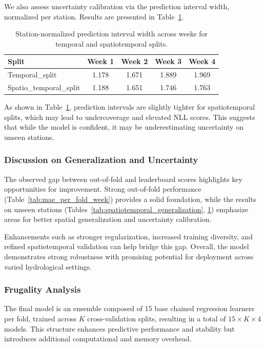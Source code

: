 \documentclass[ruler]{CUP-JNL-EDS}%
\begin{document}
We also assess uncertainty calibration via the prediction interval width, normalized per station. Results are presented in Table~\ref{tab:normalized_interval_width}.

\begin{table}[!htp]
\centering
\begin{tabular}{lcccc}
\hline
\textbf{Split} & \textbf{Week 1} & \textbf{Week 2} & \textbf{Week 3} & \textbf{Week 4} \\
\hline
Temporal\_split & 1.178 & 1.671 & 1.889 & 1.969 \\
Spatio\_temporal\_split & 1.188 & 1.651 & 1.746 & 1.763 \\
\hline
\end{tabular}
\caption{Station-normalized prediction interval width across weeks for temporal and spatiotemporal splits.}
\label{tab:normalized_interval_width}
\end{table}

\noindent As shown in Table~\ref{tab:normalized_interval_width}, prediction intervals are slightly tighter for spatiotemporal splits, which may lead to undercoverage and elevated NLL scores. This suggests that while the model is confident, it may be underestimating uncertainty on unseen stations.

\subsubsection*{Discussion on Generalization and Uncertainty}

The observed gap between out-of-fold and leaderboard scores highlights key opportunities for improvement. Strong out-of-fold performance (Table~\ref{tab:mae_per_fold_week}) provides a solid foundation, while the results on unseen stations (Tables~\ref{tab:spatiotemporal_generalization}, \ref{tab:normalized_interval_width}) emphasize areas for better spatial generalization and uncertainty calibration.

Enhancements such as stronger regularization, increased training diversity, and refined spatiotemporal validation can help bridge this gap. Overall, the model demonstrates strong robustness with promising potential for deployment across varied hydrological settings.


\subsubsection{Frugality Analysis}
\label{sec:frugality}
The final model is an ensemble composed of 15 base chained regression learners per fold, trained across $K$ cross-validation splits, resulting in a total of $15 \times K \times 4$  models. This structure enhances predictive performance and stability but introduces additional computational and memory overhead.
\end{document}
